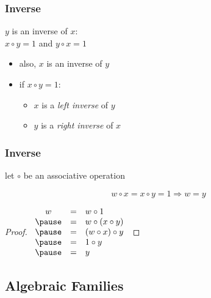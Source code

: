 \documentclass[dvipsnames]{beamer}
\begin{document}
\begin{frame}
  \frametitle{Inverse}

  \begin{definition}
    $y$ is an \alert{inverse} of $x$:\\
    $x \circ y = 1$ and $y \circ x = 1$

    \begin{itemize}
      \item also, $x$ is an inverse of $y$
    \end{itemize}
  \end{definition}

  \pause
  \begin{itemize}
    \item if $x \circ y = 1$:
    \begin{itemize}
      \item $x$ is a \emph{left inverse} of $y$
      \item $y$ is a \emph{right inverse} of $x$
    \end{itemize}
  \end{itemize}
\end{frame}

\begin{frame}
  \frametitle{Inverse}

  \begin{theorem}
    let $\circ$ be an associative operation

    \[ w \circ x = x \circ y = 1 \Rightarrow w = y \]
  \end{theorem}

  \pause
  \begin{proof}
    $\begin{array}{ccl}
      w & = & w \circ 1\\ \pause
        & = & w \circ (x \circ y)\\ \pause
        & = & (w \circ x) \circ y\\ \pause
        & = & 1 \circ y\\ \pause
        & = & y
    \end{array}$
  \end{proof}
\end{frame}

\subsection{Algebraic Families}
\end{document}
